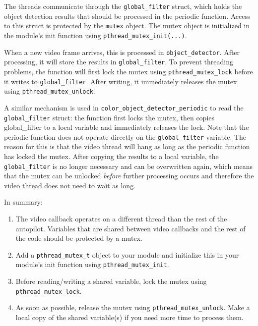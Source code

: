 \documentclass{article}
\begin{document}
The threads communicate through the \texttt{global\_filter} struct, which holds the object detection results that should be processed in the periodic function. Access to this struct is protected by the \texttt{mutex} object. The mutex object is initialized in the module's init function using \texttt{pthread\_mutex\_init(...)}.

When a new video frame arrives, this is processed in \texttt{object\_detector}. After processing, it will store the results in \texttt{global\_filter}. To prevent threading problems, the function will first lock the mutex using \texttt{pthread\_mutex\_lock} before it writes to \texttt{global\_filter}. After writing, it immediately releases the mutex using \texttt{pthread\_mutex\_unlock}.

A similar mechanism is used in \texttt{color\_object\_detector\_periodic} to read the \texttt{global\_filter} struct: the function first locks the mutex, then copies global\_filter to a local variable and immediately releases the lock.
Note that the periodic function does not operate directly on the \texttt{global\_filter} variable. The reason for this is that the video thread will hang as long as the periodic function has locked the mutex. After copying the results to a local variable, the \texttt{global\_filter} is no longer necessary and can be overwritten again, which means that the mutex can be unlocked \emph{before} further processing occurs and therefore the video thread does not need to wait as long.

In summary:
\begin{enumerate}
\item The video callback operates on a different thread than the rest of the autopilot. Variables that are shared between video callbacks and the rest of the code should be protected by a mutex.
\item Add a \texttt{pthread\_mutex\_t} object to your module and initialize this in your module's init function using \texttt{pthread\_mutex\_init}.
\item Before reading/writing a shared variable, lock the mutex using \texttt{pthread\_mutex\_lock}.
\item As soon as possible, release the mutex using \texttt{pthread\_mutex\_unlock}. Make a local copy of the shared variable(s) if you need more time to process them.
\end{enumerate}
\end{document}

